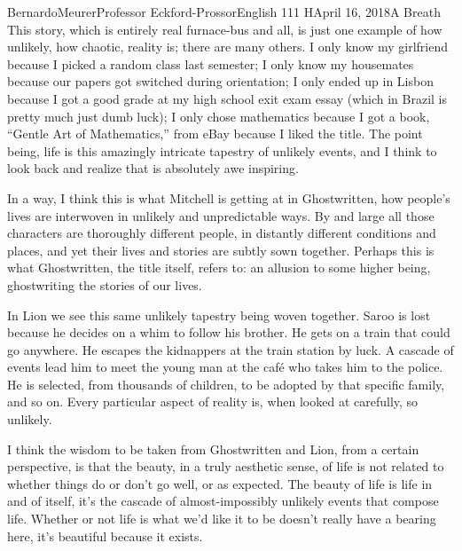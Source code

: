 \documentclass[12pt,letterpaper]{article}
\begin{document}
\begin{mla}{Bernardo}{Meurer}{Professor Eckford-Prossor}{English 111 H}{April 16, 2018}{A Breath}
	This story, which is entirely real furnace-bus and all, is just one example of how unlikely, how chaotic, reality is; there are many others. I only know my girlfriend because I picked a random class last semester; I only know my housemates because our papers got switched during orientation; I only ended up in Lisbon because I got a good grade at my high school exit exam essay (which in Brazil is pretty much just dumb luck); I only chose mathematics because I got a book, ``Gentle Art of Mathematics,'' from eBay because I liked the title. The point being, life is this amazingly intricate tapestry of unlikely events, and I think to look back and realize that is absolutely awe inspiring.

	In a way, I think this is what Mitchell is getting at in Ghostwritten, how people's lives are interwoven in unlikely and unpredictable ways. By and large all those characters are thoroughly different people, in distantly different conditions and places, and yet their lives and stories are subtly sown together. Perhaps this is what Ghostwritten, the title itself, refers to: an allusion to some higher being, ghostwriting the stories of our lives.

	In Lion we see this same unlikely tapestry being woven together. Saroo is lost because he decides on a whim to follow his brother. He gets on a train that could go anywhere. He escapes the kidnappers at the train station by luck. A cascade of events lead him to meet the young man at the café who takes him to the police. He is selected, from thousands of children, to be adopted by that specific family, and so on. Every particular aspect of reality is, when looked at carefully, so unlikely.

	I think the wisdom to be taken from Ghostwritten and Lion, from a certain perspective, is that the beauty, in a truly aesthetic sense, of life is not related to whether things do or don't go well, or as expected. The beauty of life is life in and of itself, it's the cascade of almost-impossibly unlikely events that compose life. Whether or not life is what we'd like it to be doesn't really have a bearing here, it's beautiful because it exists.
\end{mla}
\end{document}
